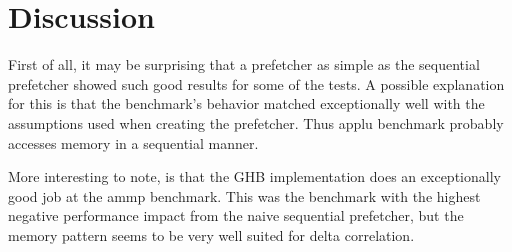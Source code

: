 \section{Discussion}
\label{sec:discussion}
First of all, it may be surprising that a prefetcher as simple as the sequential prefetcher showed such good results for some of the tests.
A possible explanation for this is that the benchmark's behavior matched exceptionally well with the assumptions used when creating the prefetcher.
Thus  applu benchmark probably accesses memory in a sequential manner.

More interesting to note, is that the GHB implementation does an exceptionally good job at the ammp benchmark.
This was the benchmark with the highest negative performance impact from the naive sequential prefetcher, but the memory pattern seems to be very well suited for delta correlation.
